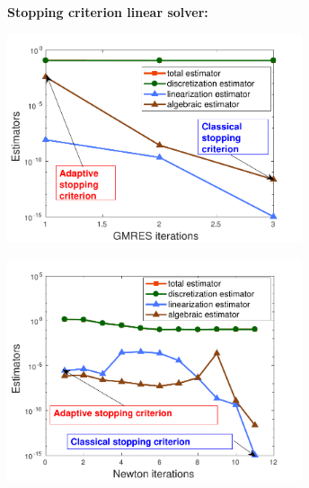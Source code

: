 \documentclass[a0,portrait]{a0poster}
\begin{document}
\begin{multicols}{2}
\begin{tcolorbox}
\textcolor{cadmiumgreen}{\textbf{Stopping criterion linear solver:}} \\
\begin{minipage}{0.5 \linewidth}
  \centering
\includegraphics[width=0.65\textwidth]{image/image_Jad/modif_picture_estimators_two_phase_gmres}
\end{minipage}
\hfill
\begin{minipage}{0.5 \linewidth}
\centering
\includegraphics[width=0.65\textwidth]{image/image_Jad/modif_picture_estimators_two_phase}
\end{minipage}    
\end{tcolorbox}


\end{multicols}
\end{document}
